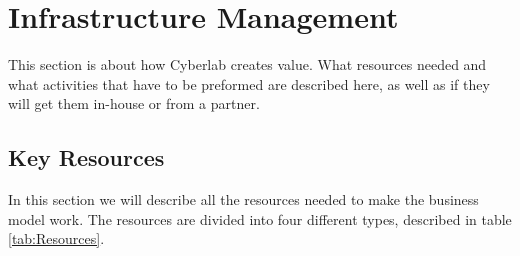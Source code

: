 \section{Infrastructure Management}
This section is about how Cyberlab creates value. What resources needed and what activities that have to be preformed are described here, as well as if they will get them in-house or from a partner. 

\subsection{Key Resources}

In this section we will describe all the resources needed to make the business model work. The resources are divided into four different types, described in table \ref{tab:Resources}.
\newpage

